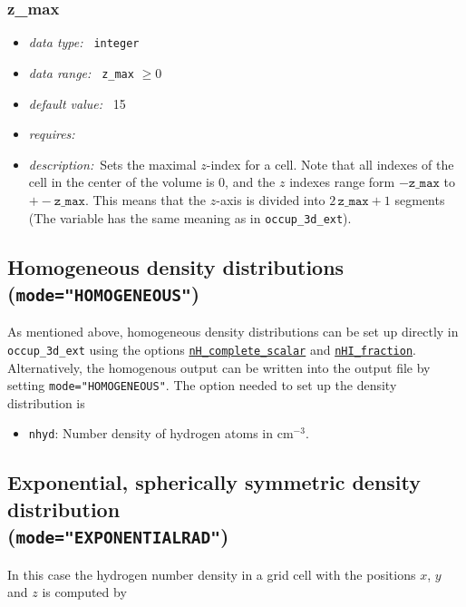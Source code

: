 \documentclass[a4paper,10pt]{article}
\begin{document}
\begin{appendix}
\subsubsection{z\_max}
\label{hydoptnl:zmax}
\begin{itemize}
 \item \textit{data type:~} \texttt{integer}
 \item \textit{data range:~} \texttt{z\_max} $\ge0$
 \item \textit{default value:~} 15
 \item \textit{requires:~}
 \item \textit{description:~}Sets the maximal $z$-index for a cell. Note that
  all indexes of the cell in the center of the volume is 0, and the  $z$ 
  indexes range form $-\mathtt{z\_max}$ to $+-\mathtt{z\_max}$. This means that 
  the $z$-axis is divided into $2\, \mathtt{z\_max} +1$ segments (The variable 
  has the same meaning as in \texttt{occup\_3d\_ext}).
\end{itemize}


\subsection{Homogeneous density distributions\\ (\texttt{mode="HOMOGENEOUS"})} 
As mentioned above, homogeneous density distributions can be set up directly in 
\texttt{occup\_3d\_ext} using the options 
\hyperref[opt:nhcompletescalar]{\texttt{nH\_complete\_scalar}} and
\hyperref[opt:nhifraction]{\texttt{nHI\_fraction}}. Alternatively, the 
homogenous output can be written into the output file by setting 
\texttt{mode="HOMOGENEOUS"}.
The option needed to set up the density distribution is 
\begin{itemize}
 \item \texttt{nhyd}: Number density of hydrogen atoms in $\mathrm{cm}^{-3}$.  
\end{itemize}

\subsection{Exponential, spherically symmetric density distribution\\ 
(\texttt{mode="EXPONENTIALRAD"})}
In this case the hydrogen number density in a grid cell with the positions $x$, 
$y$ and $z$ is computed by


\end{appendix}
\end{document}
